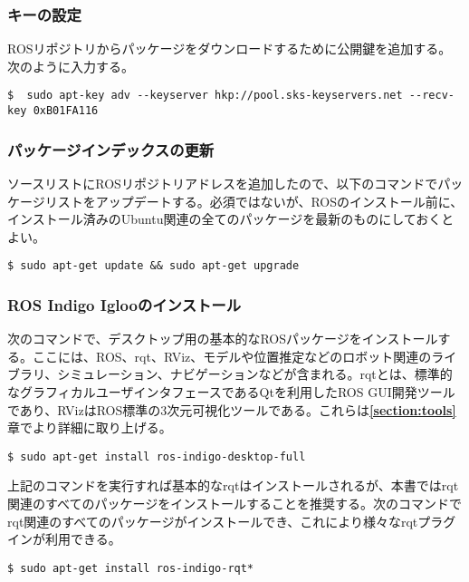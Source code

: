 \subsubsection{キーの設定}

ROSリポジトリからパッケージをダウンロードするために公開鍵を追加する。次のように入力する。

\begin{lstlisting}[language=ROS]
$  sudo apt-key adv --keyserver hkp://pool.sks-keyservers.net --recv-key 0xB01FA116
\end{lstlisting}

\subsubsection{パッケージインデックスの更新}

ソースリストにROSリポジトリアドレスを追加したので、以下のコマンドでパッケージリストをアップデートする。必須ではないが、ROSのインストール前に、インストール済みのUbuntu関連の全てのパッケージを最新のものにしておくとよい。

\begin{lstlisting}[language=ROS]
$ sudo apt-get update && sudo apt-get upgrade
\end{lstlisting}

\subsubsection{ROS Indigo Iglooのインストール}

次のコマンドで、デスクトップ用の基本的なROSパッケージをインストールする。ここには、ROS、rqt、RViz、モデルや位置推定などのロボット関連のライブラリ、シミュレーション、ナビゲーションなどが含まれる。rqtとは、標準的なグラフィカルユーザインタフェースであるQtを利用したROS GUI開発ツールであり、RVizはROS標準の3次元可視化ツールである。これらは\textbf{\ref{section:tools}}章でより詳細に取り上げる。

\begin{lstlisting}[language=ROS]
$ sudo apt-get install ros-indigo-desktop-full
\end{lstlisting}

上記のコマンドを実行すれば基本的なrqtはインストールされるが、本書ではrqt関連のすべてのパッケージをインストールすることを推奨する。次のコマンドでrqt関連のすべてのパッケージがインストールでき、これにより様々なrqtプラグインが利用できる。

\begin{lstlisting}[language=ROS]
$ sudo apt-get install ros-indigo-rqt*
\end{lstlisting}

